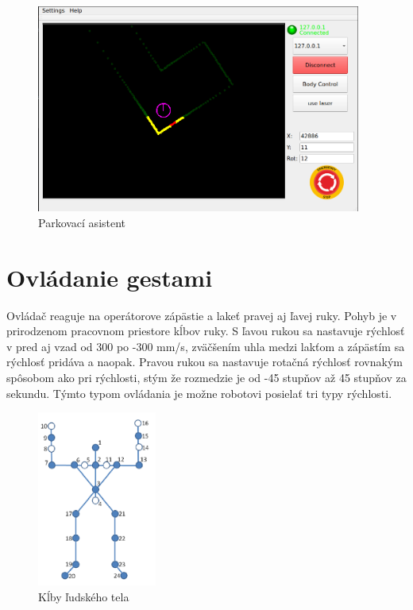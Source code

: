 \begin{figure}[!htbp]
	\begin{center}
		\includegraphics[width=0.95\textwidth]{img/parking_camera.png}
	\end{center}
	\caption{Parkovací asistent}
	\label{fig:parking}
\end{figure}

\section{Ovládanie gestami}

Ovládač reaguje na operátorove zápästie a lakeť pravej aj ľavej ruky. Pohyb je v prirodzenom pracovnom priestore kĺbov ruky.
S ľavou rukou sa nastavuje rýchlosť v pred aj vzad od 300 po -300 mm/s, zväčšením uhla medzi lakťom a zápästím sa rýchlosť pridáva a naopak.
Pravou rukou sa nastavuje rotačná rýchlosť rovnakým spôsobom ako pri rýchlosti, stým že rozmedzie je od -45 stupňov až 45 stupňov za sekundu.
Týmto typom ovládania je možne robotovi posielať tri typy rýchlosti.

\begin{figure}[!htbp]
	\begin{center}
		\includegraphics[width=0.35\textwidth]{img/skeleton.png}
	\end{center}
	\caption{Kĺby ľudského tela}
	\label{fig:skeleton}
\end{figure}

